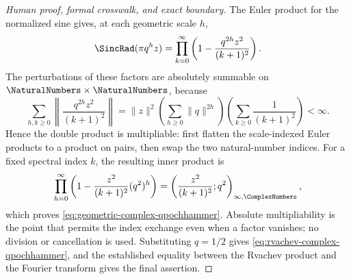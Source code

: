 \documentclass[11pt,oneside]{article}
\theoremstyle{definition}
\theoremstyle{remark}
\begin{document}
\begin{proof}[Human proof, formal crosswalk, and exact boundary]
The Euler product for the normalized sine gives, at each geometric scale \(h\),
\[
 \SincRad(\pi q^h z)
 =\prod_{k=0}^{\infty}
   \left(1-\frac{q^{2h}z^2}{(k+1)^2}\right).
\]
The perturbations of these factors are absolutely summable on
\(\NaturalNumbers\times\NaturalNumbers\), because
\[
 \sum_{h,k\ge0}
  \left\lVert\frac{q^{2h}z^2}{(k+1)^2}\right\rVert
 =\lVert z\rVert^2
   \left(\sum_{h\ge0}\lVert q\rVert^{2h}\right)
   \left(\sum_{k\ge0}\frac1{(k+1)^2}\right)<\infty.
\]
Hence the double product is multipliable: first flatten the scale-indexed Euler
products to a product on pairs, then swap the two natural-number indices.  For a
fixed spectral index \(k\), the resulting inner product is
\[
 \prod_{h=0}^{\infty}
   \left(1-\frac{z^2}{(k+1)^2}(q^2)^h\right)
 =\left(\frac{z^2}{(k+1)^2};q^2\right)_{\infty,\ComplexNumbers},
\]
which proves \eqref{eq:geometric-complex-qpochhammer}.  Absolute
multipliability is the point that permits the index exchange even when a factor
vanishes; no division or cancellation is used.  Substituting \(q=1/2\) gives
\eqref{eq:rvachev-complex-qpochhammer}, and the established equality between
the Rvachev product and the Fourier transform gives the final assertion.


\end{proof}
\end{document}
